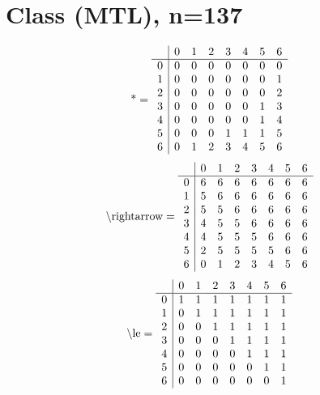 \documentclass[11pt]{article}
\begin{document}
\section{Class (MTL), n=137}
\[\text{*} = 
\begin{array}{r | r r r r r r r}
 & 0 & 1 & 2 & 3 & 4 & 5 & 6 \\ \hline
0 & 0 & 0 & 0 & 0 & 0 & 0 & 0 \\
1 & 0 & 0 & 0 & 0 & 0 & 0 & 1 \\
2 & 0 & 0 & 0 & 0 & 0 & 0 & 2 \\
3 & 0 & 0 & 0 & 0 & 0 & 1 & 3 \\
4 & 0 & 0 & 0 & 0 & 0 & 1 & 4 \\
5 & 0 & 0 & 0 & 1 & 1 & 1 & 5 \\
6 & 0 & 1 & 2 & 3 & 4 & 5 & 6 \\
\end{array}
\]
\[\text{\textbackslash rightarrow} = 
\begin{array}{r | r r r r r r r}
 & 0 & 1 & 2 & 3 & 4 & 5 & 6 \\ \hline
0 & 6 & 6 & 6 & 6 & 6 & 6 & 6 \\
1 & 5 & 6 & 6 & 6 & 6 & 6 & 6 \\
2 & 5 & 5 & 6 & 6 & 6 & 6 & 6 \\
3 & 4 & 5 & 5 & 6 & 6 & 6 & 6 \\
4 & 4 & 5 & 5 & 5 & 6 & 6 & 6 \\
5 & 2 & 5 & 5 & 5 & 5 & 6 & 6 \\
6 & 0 & 1 & 2 & 3 & 4 & 5 & 6 \\
\end{array}
\]
\[\text{\textbackslash le} = 
\begin{array}{r | r r r r r r r}
 & 0 & 1 & 2 & 3 & 4 & 5 & 6 \\ \hline
0 & 1 & 1 & 1 & 1 & 1 & 1 & 1 \\
1 & 0 & 1 & 1 & 1 & 1 & 1 & 1 \\
2 & 0 & 0 & 1 & 1 & 1 & 1 & 1 \\
3 & 0 & 0 & 0 & 1 & 1 & 1 & 1 \\
4 & 0 & 0 & 0 & 0 & 1 & 1 & 1 \\
5 & 0 & 0 & 0 & 0 & 0 & 1 & 1 \\
6 & 0 & 0 & 0 & 0 & 0 & 0 & 1 \\
\end{array}
\]
\end{document}
